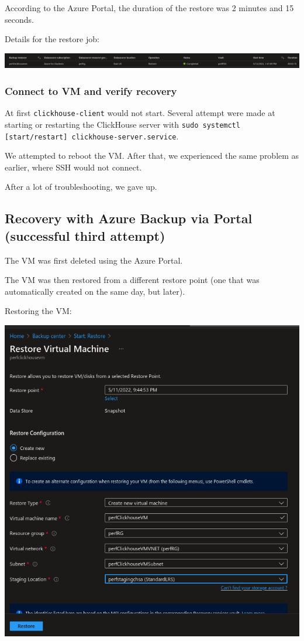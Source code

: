 According to the Azure Portal, the duration of the restore
was 2 minutes and 15 seconds.

Details for the restore job:
\begin{center}
\includegraphics[width=.9\linewidth]{figures/clickhouse/ab_restore_duration.png}
\end{center}

\subsubsection{Connect to VM and verify recovery}
\label{sec:org7097732}
At first \texttt{clickhouse-client} would not start.
Several attempt were made at starting or restarting the ClickHouse server with
\texttt{sudo systemctl [start/restart] clickhouse-server.service}.

We attempted to reboot the VM.
After that, we experienced the same problem as earlier, where SSH would not connect.

After a lot of troubleshooting, we gave up.

\subsection{Recovery with Azure Backup via Portal (successful third attempt)}
\label{sec:org1aa719c}
The VM was first deleted using the Azure Portal.

The VM was then restored from a different restore point
(one that was automatically created on the same day, but later).

Restoring the VM:
\begin{center}
\includegraphics[width=.9\linewidth]{figures/clickhouse/ab_restore_2.png}
\end{center}

